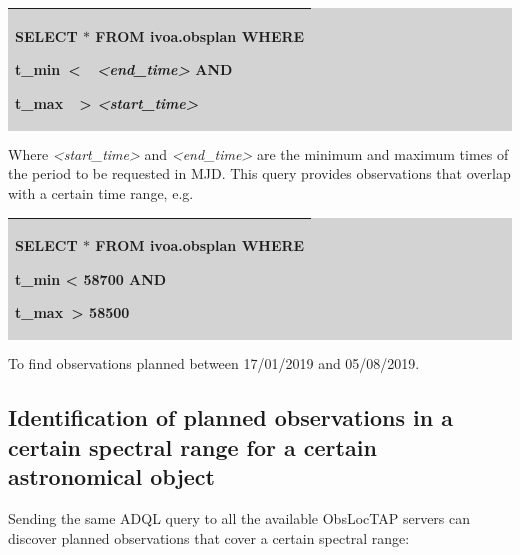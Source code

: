 \documentclass[11pt,a4paper]{ivoa}
\begin{document}
\bigskip
\par
\begingroup\setlength{\fboxsep}{0pt}
\colorbox{lightgray}{%
\begin{tabular}{|p{5.53in}|}
\hline
SELECT $\ast$  FROM ivoa.obsplan WHERE  \par  t\_min\  <\ \  \textit{<end\_time>} AND \par  t\_max\ \ >  \textit{<start\_time>} \\
\hline
\end{tabular}%
}\endgroup
\par
\bigskip
Where \textit{<start\_time>} and \textit{<end\_time> }are the minimum and maximum times of the period to be requested in MJD. This query provides observations that overlap with a certain time range, e.g.

\bigskip
\par
\begingroup\setlength{\fboxsep}{0pt}
\colorbox{lightgray}{%
\begin{tabular}{|p{5.53in}|}
\hline
SELECT $\ast$  FROM ivoa.obsplan WHERE  \par  t\_min < 58700 AND  \par  t\_max\  > 58500 \\
\hline
\end{tabular}%
}\endgroup
\par
\bigskip

To find observations planned between 17/01/2019 and 05/08/2019.

\subsection{Identification of planned observations in a certain spectral range for a certain astronomical object}
Sending the same ADQL query to all the available ObsLocTAP servers can discover planned observations that cover a certain spectral range:
\end{document}
